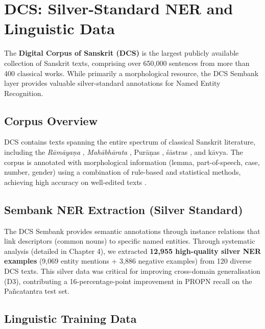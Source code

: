 \section{DCS: Silver-Standard NER and Linguistic Data}
\label{sec:dcs}

The \textbf{Digital Corpus of Sanskrit (DCS)} \cite{hellwig2010dcs} is the largest publicly available collection of Sanskrit texts, comprising over 650,000 sentences from more than 400 classical works. While primarily a morphological resource, the DCS Sembank layer \cite{hellwig2025sembank} provides valuable silver-standard annotations for Named Entity Recognition.

\subsection{Corpus Overview}
\label{subsec:dcs_overview}

DCS contains texts spanning the entire spectrum of classical Sanskrit literature, including the \textit{Rāmāyaṇa} \cite{ramayana}, \textit{Mahābhārata} \cite{mahabharata}, Purāṇas \cite{purana}, śāstras \cite{sastras}, and kāvya. The corpus is annotated with morphological information (lemma, part-of-speech, case, number, gender) using a combination of rule-based and statistical methods, achieving high accuracy on well-edited texts \cite{hellwig2010dcs}.

\subsection{Sembank NER Extraction (Silver Standard)}
\label{subsec:sembank_ner}

The DCS Sembank provides semantic annotations through instance relations that link descriptors (common nouns) to specific named entities. Through systematic analysis (detailed in Chapter 4), we extracted \textbf{12,955 high-quality silver NER examples} (9,069 entity mentions + 3,886 negative examples) from 120 diverse DCS texts. This silver data was critical for improving cross-domain generalisation (D3), contributing a 16-percentage-point improvement in PROPN recall on the Pañcatantra \cite{pancatantra_text} test set.

\subsection{Linguistic Training Data}
\label{subsec:linguistic_data}

